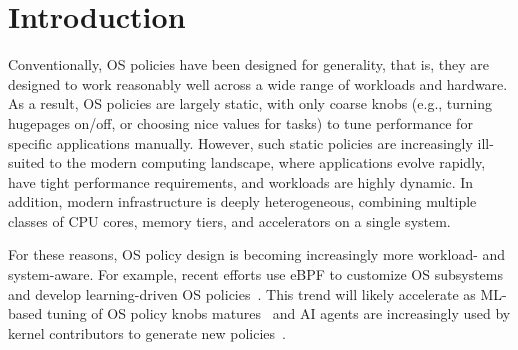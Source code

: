 \section{Introduction}\label{sec:introduction}

Conventionally, OS policies have been designed for generality, that is, they are designed to work reasonably well across a wide range of workloads and hardware. As a result, OS policies are largely static, with only coarse knobs (e.g., turning hugepages on/off, or choosing nice values for tasks) to tune performance for specific applications manually.
However, such static policies are increasingly ill-suited to the modern computing landscape, where applications  evolve rapidly, have tight performance requirements, and workloads are highly dynamic. In addition, modern infrastructure is deeply heterogeneous, combining multiple classes of CPU cores, memory tiers, and accelerators on a single system.

For these reasons, OS policy design is becoming increasingly more workload- and system-aware. For example, recent efforts use eBPF to customize OS subsystems~\cite{kflex-sosp24,cache-ext-sosp25,sched-ext,meta-lavd} and develop learning-driven OS policies~\cite{heimdall-eurosys25,orca-sigcomm20,kml-tos23,kleio-hpdc19}. This trend will likely accelerate as ML-based tuning of OS policy knobs matures~\cite{tuning-pacmi25,agentic-tuning-ml4sys25} and AI agents are increasingly used by kernel contributors to generate new policies~\cite{policysmith-hotnets25,glia-arxiv25,barbarians25,vulcan-arxiv25,agentic-os-ml4sys25}.


